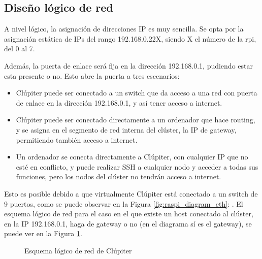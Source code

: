 \subsection{Diseño lógico de red}
A nivel lógico, la asignación de direcciones IP es muy sencilla. Se opta por la asignación estática de IPs del rango 192.168.0.22X, siendo X el número de la \acrlong{rpi}, del 0 al 7.

Además, la puerta de enlace será fija en la dirección 192.168.0.1, pudiendo estar esta presente o no. Esto abre la puerta a tres escenarios:
\begin{itemize}
    \item Clúpiter puede ser conectado a un switch que da acceso a una red con puerta de enlace en la dirección 192.168.0.1, y así tener acceso a internet.
    \item Clúpiter puede ser conectado directamente a un ordenador que hace routing, y se asigna en el segmento de red interna del clúster, la IP de gateway, permitiendo también acceso a internet.
    \item Un ordenador se conecta directamente a Clúpiter, con cualquier IP que no esté en conflicto, y puede realizar SSH a cualquier nodo y acceder a todas sus funciones, pero los nodos del clúster no tendrán acceso a internet.
\end{itemize}

Esto es posible debido a que virtualmente Clúpiter está conectado a un switch de 9 puertos, como se puede observar en la Figura \ref{fig:raspi_diagram_eth}: . El esquema lógico de red para el caso en el que existe un host conectado al clúster, en la IP 192.168.0.1, haga de gateway o no (en el diagrama sí es el gateway), se puede ver en la Figura \ref{fig:raspi_diagram_logical}.

\begin{figure}[h!]
  \centering
  \vspace*{0.5cm}
  \def\svgwidth{\textwidth}
  
  \caption{Esquema lógico de red de Clúpiter}
  \label{fig:raspi_diagram_logical}
\end{figure}